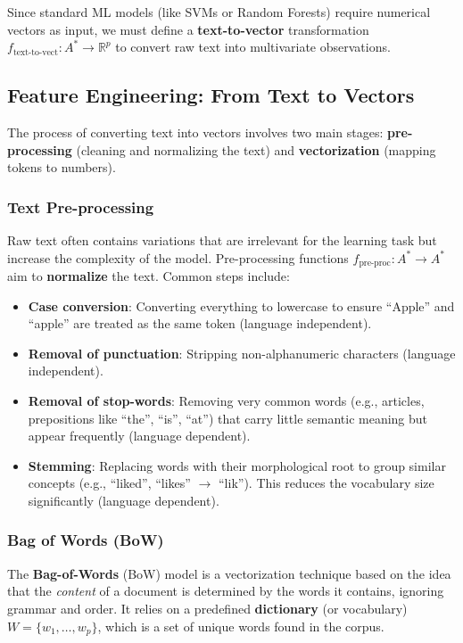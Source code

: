 Since standard ML models (like SVMs or Random Forests) require numerical vectors as input, we must define a \textbf{text-to-vector} transformation $f_{\text{text-to-vect}}: A^* \to \mathbb{R}^p$ to convert raw text into multivariate observations.

\subsection{Feature Engineering: From Text to Vectors}

The process of converting text into vectors involves two main stages: \textbf{pre-processing} (cleaning and normalizing the text) and \textbf{vectorization} (mapping tokens to numbers).

\subsubsection{Text Pre-processing}

Raw text often contains variations that are irrelevant for the learning task but increase the complexity of the model. Pre-processing functions $f_{\text{pre-proc}}: A^* \to A^*$ aim to \textbf{normalize} the text. Common steps include:

\begin{itemize}
    \item \textbf{Case conversion}: Converting everything to lowercase to ensure ``Apple'' and ``apple'' are treated as the same token (language independent).
    \item \textbf{Removal of punctuation}: Stripping non-alphanumeric characters (language independent).
    \item \textbf{Removal of stop-words}: Removing very common words (e.g., articles, prepositions like ``the'', ``is'', ``at'') that carry little semantic meaning but appear frequently (language dependent).
    \item \textbf{Stemming}: Replacing words with their morphological root to group similar concepts (e.g., ``liked'', ``likes'' $\to$ ``lik''). This reduces the vocabulary size significantly (language dependent).
\end{itemize}

\subsubsection{Bag of Words (BoW)}

The \textbf{Bag-of-Words} (BoW) model is a vectorization technique based on the idea that the \textit{content} of a document is determined by the words it contains, ignoring grammar and order.
It relies on a predefined \textbf{dictionary} (or vocabulary) $W = \{w_1, \dots, w_p\}$, which is a set of unique words found in the corpus.

